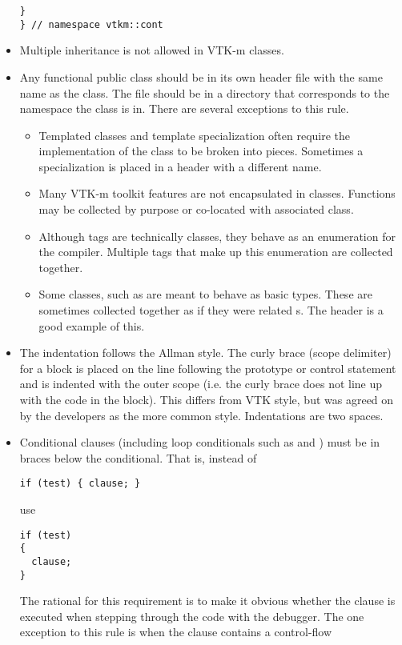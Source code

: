 \begin{itemize}
\begin{verbatim}
}
} // namespace vtkm::cont
\end{verbatim}
\item Multiple inheritance is not allowed in VTK-m classes.
\item Any functional public class should be in its own header file with the
  same name as the class. The file should be in a directory that
  corresponds to the namespace the class is in. There are several
  exceptions to this rule.
  \begin{itemize}
  \item Templated classes and template specialization often require the
    implementation of the class to be broken into pieces. Sometimes a
    specialization is placed in a header with a different name.
  \item Many VTK-m toolkit features are not encapsulated in
    classes. Functions may be collected by purpose or co-located with
    associated class.
  \item Although tags are technically classes, they behave as an
    enumeration for the compiler. Multiple tags that make up this
    enumeration are collected together.
  \item Some classes, such as  are meant to behave as basic
    types. These are sometimes collected together as if they were related
    s. The  header is a good
    example of this.
  \end{itemize}
\item The indentation follows the Allman style. The curly brace (scope
  delimiter) for a block is placed on the line following the prototype or
  control statement and is indented with the outer scope (i.e. the curly
  brace does not line up with the code in the block). This differs from VTK
  style, but was agreed on by the developers as the more common
  style. Indentations are two spaces.
\item Conditional clauses (including loop conditionals such as
   and ) must be in braces below the
  conditional. That is, instead of
\begin{verbatim}
if (test) { clause; }
\end{verbatim}
  use
\begin{verbatim}
if (test)
{
  clause;
}
\end{verbatim}
  The rational for this requirement is to make it obvious whether the
  clause is executed when stepping through the code with the debugger. The
  one exception to this rule is when the clause contains a control-flow

\end{itemize}
